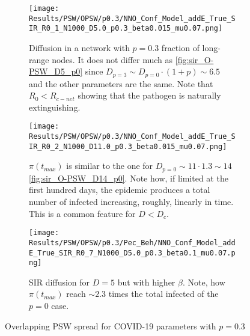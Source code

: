 \documentclass[a4paper,10pt,twoside]{book} %
\theoremstyle{definition}
\begin{document}
\begin{figure}[htbp]
	\centering
	\begin{subfigure}[t]{\linewidth}
		\centering
		\texttt{[image: Results/PSW/OPSW/p0.3/NNO\_Conf\_Model\_addE\_True\_SIR\_R0\_1\_N1000\_D5.0\_p0.3\_beta0.015\_mu0.07.png]}
		\caption{Diffusion in a network with $p = 0.3$ fraction of long-range nodes. It does not differ much as \autoref{fig:sir_O-PSW_D5_p0} since $D_{p=3} \sim D_{p=0} \cdot (1+p) \sim 6.5$ and the other parameters are the same. Note that $R_0 < R_{c-net}$ showing that the pathogen is naturally extinguishing.}
		\label{fig:sir_O-PSW_D5_p0.3}
	\end{subfigure}
	\begin{subfigure}[t]{\linewidth}
		\centering
		\texttt{[image: Results/PSW/OPSW/p0.3/NNO\_Conf\_Model\_addE\_True\_SIR\_R0\_2\_N1000\_D11.0\_p0.3\_beta0.015\_mu0.07.png]}
		\caption{$\pi(t_{max})$ is similar to the one for $D_{p=0} \sim 11 \cdot 1.3 \sim 14$ \autoref{fig:sir_O-PSW_D14_p0}. Note how, if limited at the first hundred days, the epidemic produces a total number of infected increasing, roughly, linearly in time. This is a common feature for $D < D_c$.}
		\label{fig:sir_O-PSW_D11_p0.3}
	\end{subfigure}
	\begin{subfigure}[t]{\linewidth}
		\centering
		\texttt{[image: Results/PSW/OPSW/p0.3/Pec\_Beh/NNO\_Conf\_Model\_addE\_True\_SIR\_R0\_7\_N1000\_D5.0\_p0.3\_beta0.1\_mu0.07.png]}
		\caption{SIR diffusion for $ D = 5$ but with higher $\beta$. Note, how $\pi(t_{max})$ reach $\sim 2.3$ times the total infected of the $ p=0$  case.}
		\label{fig:sir_O-PSW_D5_p0.3_b0.1}
	\end{subfigure}
	\caption{Overlapping PSW spread for COVID-19 parameters with $p = 0.3$ }
\end{figure}

\clearpage
\end{document}
